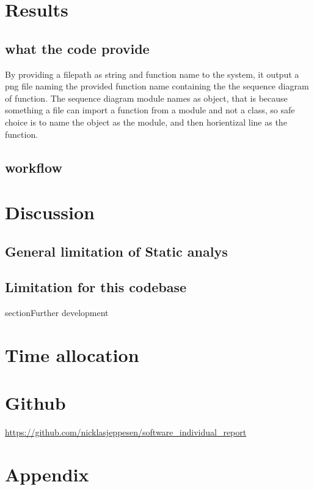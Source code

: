 \documentclass[12pt,a4paper]{report}
\begin{document}
    \chapter{Results}

    \section{what the code provide}
    By providing a filepath as string and function name to the system, it output a png file naming the provided function name containing the the sequence diagram of function. The sequence diagram module names as object, that is because something a file can import a function from a module and not a class, so safe choice is to name the object as the module, and then horientizal line as the function. 

    \section{workflow}
    


    \chapter{Discussion}

    
    
    \section*{General limitation of Static analys}

    \section{Limitation for this codebase}

    section{Further development} 


    \chapter{Time allocation}

    \chapter{Github}

    \url{https://github.com/nicklasjeppesen/software_individual_report}

    \chapter{Appendix}
    
    
    
    






   
    
\end{document}
